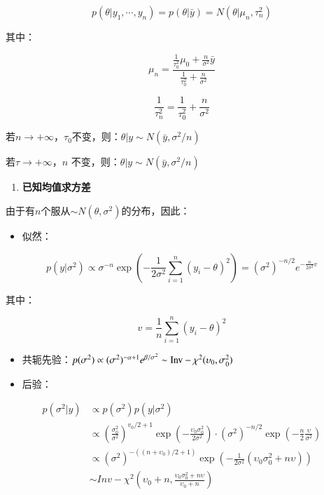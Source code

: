 \[p(\theta|y_1,\cdots,y_n)=p(\theta|\bar y)=N(\theta | \mu_n,\tau_n^2)\]

其中：

\[\mu_{n}=\frac{\frac{1}{\tau_{0}^{2}} \mu_{0}+\frac{n}{\sigma^{2}} \bar{y}}{\frac{1}{\tau_{0}^{2}}+\frac{n}{\sigma^{2}}}\]

\[\frac{1}{\tau_{n}^{2}}=\frac{1}{\tau_{0}^{2}}+\frac{n}{\sigma^{2}}\]

若\(n\rightarrow+\infty\)，\(\tau_0\)不变，则：\(\theta|y\sim N(\bar{y},\sigma^2/n)\)

若\(\tau\rightarrow+\infty\)，\(n\)
不变，则：\(\theta|y\sim N(\bar{y},\sigma^2/n)\)

\begin{enumerate}
\def\labelenumi{\arabic{enumi}.}
\item
  \textbf{已知均值求方差}
\end{enumerate}

由于有\(n\)个服从\(\sim N(\theta,\sigma^2)\)的分布，因此：

\begin{itemize}
\item
  似然：
\end{itemize}

\begin{equation}
  p(y|\sigma^2)\propto\sigma^{-n}\exp\left(-
\frac{1}{2\sigma^2}\sum_{i=1}^{n}(y_i-\theta)^2
\right)=(\sigma^2)^{-n/2}e^{-\frac{n}{2\sigma^2}v}
\end{equation}


其中：

\[v=\frac{1}{n}\sum_{i=1}^n(y_i-\theta)^2\]

\begin{itemize}
\item
  共轭先验：\(p(\sigma^2)\propto(\sigma^2)^{-\alpha+1}e^{\beta/\sigma^2} \sim \rm Inv-\chi^2(\upsilon_0,\sigma^2_0)\)
\item
  后验：
\end{itemize}

\begin{equation}
    \begin{aligned}
        p(\sigma^2|y)&\propto p(\sigma^2)p(y|\sigma^2)\\
        &\propto \left( \frac{\sigma^2_0}{\sigma^2} \right)^{v_0/2+1}
        \exp\left( -\frac{\upsilon_0\sigma^2_0}{2\sigma^2} \right)\cdot
        (\sigma^2)^{-n/2}\exp\left(-\frac{n}{2}\frac{\upsilon}{\sigma^2}\right)\\
        &\propto (\sigma^2)^{-((n+\upsilon_0)/2+1)}\exp\left(
        -\frac{1}{2\sigma^2}(\upsilon_0\sigma_0^2+n\upsilon)
        \right)\\
        &\sim Inv-\chi^2(\upsilon_0+n,\frac{\upsilon_0\sigma_0^2+n\upsilon}{\upsilon_0+n})
        \end{aligned}
\end{equation}
